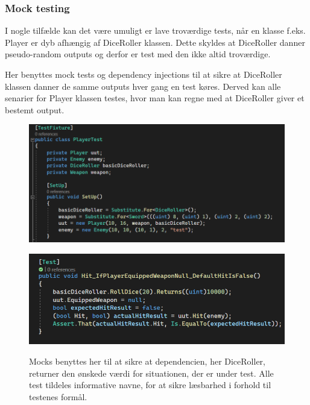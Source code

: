 \newpage 

\subsubsection{Mock testing}
I nogle tilfælde kan det være umuligt er lave troværdige tests, når
en klasse f.eks. Player er dyb afhængig af DiceRoller klassen. Dette skyldes
at DiceRoller danner pseudo-random outputs og derfor er test med den ikke 
altid troværdige.

Her benyttes mock tests og dependency injections til at sikre at DiceRoller 
klassen danner de samme outputs hver gang en test køres.
Derved kan alle senarier for Player klassen testes, hvor man kan regne med at DiceRoller giver et bestemt output. 

\begin{figure}[h]
  \centering
  \caption{}
  \includegraphics[scale=0.5]{02-Body/Images/Mocks_And_Dependency_Injection.png}
  \label{fig:mock}
\end{figure}

\begin{figure}[h]
  \centering
  \caption{Mocks benyttes her til at sikre at dependencien, her DiceRoller, returner
           den ønskede værdi for situationen, der er under test.
           Alle test tildeles informative navne, for at sikre læsbarhed i forhold 
           til testenes formål.}
  \includegraphics[scale=0.45]{02-body/Images/useofmocks.png}
  \label{fig:mockuse}
\end{figure}

